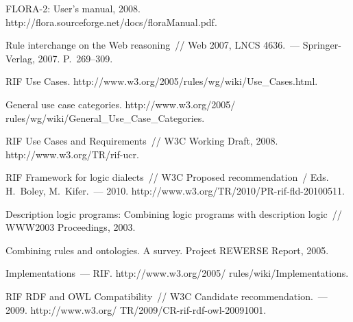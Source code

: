 \begin{multicols}{2}
{{\begin{thebibliography}{99}
FLORA-2: User's\linebreak
 manual, 2008. {\sf http://flora.sourceforge.net/docs/\linebreak floraManual.pdf}. 

Rule interchange on the Web reasoning~// Web 2007, LNCS 4636.~--- Springer-Verlag, 2007. P.~269--309.

RIF Use Cases. {\sf http://www.w3.org/2005/rules/wg/\linebreak wiki/Use\_Cases.html}.

General use case categories. {\sf http://www.w3.org/2005/ rules/wg/wiki/General\_Use\_Case\_Categories}.

RIF Use Cases and Requirements~// W3C Working Draft, 2008. {\sf http://www.w3.org/TR/rif-ucr}.

RIF Framework for logic dialects~// W3C Proposed recommendation~/ Eds. H.~Boley, M.~Kifer.~--- 2010. {\sf 
http://www.w3.org/TR/2010/PR-rif-fld-20100511}.

Description logic programs: Combining logic programs with description logic~// 
WWW2003 Proceedings, 2003.

Combining rules and ontologies. A survey. Project REWERSE Report, 2005.

Implementations~--- RIF. {\sf http://www.w3.org/2005/ rules/wiki/Implementations}.

\label{end\stat}

RIF RDF and OWL Compatibility~// W3C Candidate recommendation.~--- 2009. {\sf 
http://www.w3.org/ TR/2009/CR-rif-rdf-owl-20091001}.

 \end{thebibliography}
}
}


\end{multicols}